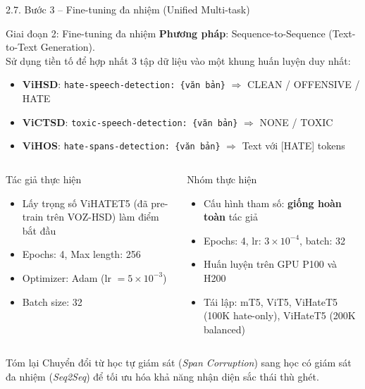 \documentclass[11pt, aspectratio=169]{beamer}
\begin{document}
\begin{frame}[shrink=5]{2.7. Bước 3 -- Fine-tuning đa nhiệm (Unified Multi-task)}

\begin{block}{Giai đoạn 2: Fine-tuning đa nhiệm}
  \textbf{Phương pháp}: Sequence-to-Sequence (Text-to-Text Generation).\\
  Sử dụng tiền tố để hợp nhất 3 tập dữ liệu vào một khung huấn luyện duy nhất:
  \begin{itemize}
    \item \textbf{ViHSD}: \texttt{hate-speech-detection: \{văn bản\}} $\Rightarrow$ CLEAN / OFFENSIVE / HATE
    \item \textbf{ViCTSD}: \texttt{toxic-speech-detection: \{văn bản\}} $\Rightarrow$ NONE / TOXIC
    \item \textbf{ViHOS}: \texttt{hate-spans-detection: \{văn bản\}} $\Rightarrow$ Text với [HATE] tokens
  \end{itemize}
\end{block}

\vspace{0.2cm}
\begin{columns}[T]
  \begin{block}{Tác giả thực hiện}
    \begin{itemize}
      \item Lấy trọng số ViHATET5 (đã pre-train trên VOZ-HSD) làm điểm bắt đầu
      \item Epochs: 4, Max length: 256
      \item Optimizer: Adam (lr $= 5 \times 10^{-3}$)
      \item Batch size: 32
    \end{itemize}
  \end{block}

  \begin{block}{Nhóm thực hiện}
    \begin{itemize}
      \item Cấu hình tham số: \textbf{giống hoàn toàn} tác giả
      \item Epochs: 4, lr: $3 \times 10^{-4}$, batch: 32
      \item Huấn luyện trên GPU P100 và H200
      \item Tái lập: mT5, ViT5, ViHateT5 (100K hate-only), ViHateT5 (200K balanced)
    \end{itemize}
  \end{block}
\end{columns}

\vspace{0.2cm}
\begin{block}{Tóm lại}
  Chuyển đổi từ học tự giám sát (\textit{Span Corruption}) sang học có giám sát đa nhiệm (\textit{Seq2Seq}) để tối ưu hóa khả năng nhận diện sắc thái thù ghét.
\end{block}
\end{frame}
\end{document}
